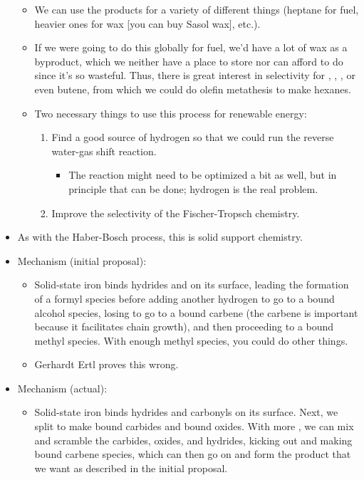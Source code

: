 \documentclass[../notes.tex]{subfiles}
\begin{document}
\begin{itemize}
\begin{itemize}
        \item We can use the products for a variety of different things (heptane for fuel, heavier ones for wax [you can buy Sasol wax], etc.).
        \item If we were going to do this globally for fuel, we'd have a lot of wax as a byproduct, which we neither have a place to store nor can afford to do since it's so wasteful. Thus, there is great interest in selectivity for , , , or even butene, from which we could do olefin metathesis to make hexanes.
        \item Two necessary things to use this process for renewable energy:
        \begin{enumerate}
            \item Find a good source of hydrogen so that we could run the reverse water-gas shift reaction.
            \begin{itemize}
                \item The reaction might need to be optimized a bit as well, but in principle that can be done; hydrogen is the real problem.
            \end{itemize}
            \item Improve the selectivity of the Fischer-Tropsch chemistry.
        \end{enumerate}
    \end{itemize}
    \item As with the Haber-Bosch process, this is solid support chemistry.
    \item Mechanism (initial proposal):
    \begin{itemize}
        \item Solid-state iron binds hydrides and  on its surface, leading the formation of a formyl species before adding another hydrogen to go to a bound alcohol species, losing  to go to a bound carbene (the carbene is important because it facilitates chain growth), and then proceeding to a bound methyl species. With enough methyl species, you could do other things.
        \item Gerhardt Ertl proves this wrong.
    \end{itemize}
    \item Mechanism (actual):
    \begin{itemize}
        \item Solid-state iron binds hydrides and carbonyls on its surface. Next, we split  to make bound carbides and bound oxides. With more , we can mix and scramble the carbides, oxides, and hydrides, kicking out  and making bound carbene species, which can then go on and form the product that we want as described in the initial proposal.

\end{itemize}
\end{itemize}
\end{document}
